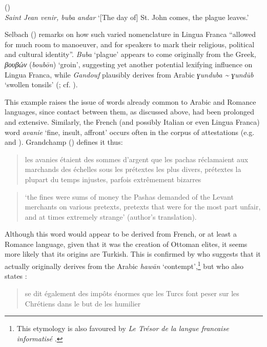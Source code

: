 \documentclass[output=paper]{langsci/langscibook}
\begin{document}
	\ea
	(\citealt{Rehbinder1800})\\
	\textit{Saint Jean venir, buba andar} 
	\glt ‘[The day of] St. John comes, the plague leaves.’ 
	\z
	
	Selbach (\citeyear[44]{Selbach2008}) remarks on how such varied nomenclature in Lingua Franca ``allowed for much room to manoeuver, and for speakers to mark their religious, political and cultural identity''. \textit{Buba} ‘plague’ appears to come originally from the Greek, \textit{βουβών} (\textit{boubōn}) ‘groin’, suggesting yet another potential lexifying influence on Lingua Franca, while \textit{Gandouf} plausibly derives from Arabic \textit{ɣunduba {\textasciitilde} ɣundūb} ‘swollen tonsils’ (\citealt[72]{Schuchardt1909}; cf. \citealt[45]{Selbach2008}). 
	
	This example raises the issue of words already common to Arabic and Romance languages, since contact between them, as discussed above, had been prolonged and extensive. Similarly, the French (and possibly Italian or even Lingua Franca) word \textit{avanie} ‘fine, insult, affront’ occurs often in the corpus of attestations (e.g. \citealt{Pananti1841} and \citealt{Grandchamp1920}). Grandchamp (\citeyear[xiii]{Grandchamp1920}) defines it thus: 
	
	\begin{quote}
		les avanies étaient des sommes d'argent que les pachas réclamaient aux marchands des échelles sous les prétextes les plus divers, prétextes la plupart du temps injustes, parfois extrêmement bizarres
	\end{quote}
	
	\begin{quote}
		‘the fines were sums of money the Pashas demanded of the Levant merchants on various pretexts, pretexts that were for the most part unfair, and at times extremely strange’ (author's translation).
	\end{quote}
	
	Although this word would appear to be derived from French, or at least a Romance language, given that it was the creation of Ottoman elites, it seems more likely that its origins are Turkish. This is confirmed by \citet{Pihan1847} who suggests that it actually originally derives from the Arabic \textit{hawān} ‘contempt’,\footnote{This etymology is also favoured by \textit{Le Trésor de la langue francaise informatisé} \citep{Dendien1994}.} but who also states \citep[46]{Pihan1847}:
	
	\begin{quote}
		se dit également des impôts énormes que les Turcs font peser sur les Chrétiens dans le but de les humilier
	\end{quote}
	
\end{document}
